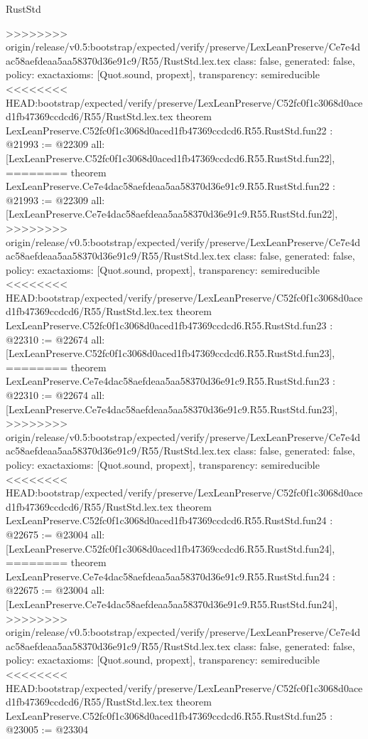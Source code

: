 \begin{lexlean}{RustStd}
\begin{coremodule}
{\begin{coremodule}
{{{{{{{{{{{{{{{{{{{{{{{{{>>>>>>>> origin/release/v0.5:bootstrap/expected/verify/preserve/LexLeanPreserve/Ce7e4dac58aefdeaa5aa58370d36e91c9/R55/RustStd.lex.tex
  class: false,
  generated: false,
  policy: exact{axioms: [Quot.sound, propext]},
  transparency: semireducible
}
<<<<<<<< HEAD:bootstrap/expected/verify/preserve/LexLeanPreserve/C52fc0f1c3068d0aced1fb47369ccdcd6/R55/RustStd.lex.tex
theorem LexLeanPreserve.C52fc0f1c3068d0aced1fb47369ccdcd6.R55.RustStd.fun22 : @21993 := @22309 {
  all: [LexLeanPreserve.C52fc0f1c3068d0aced1fb47369ccdcd6.R55.RustStd.fun22],
========
theorem LexLeanPreserve.Ce7e4dac58aefdeaa5aa58370d36e91c9.R55.RustStd.fun22 : @21993 := @22309 {
  all: [LexLeanPreserve.Ce7e4dac58aefdeaa5aa58370d36e91c9.R55.RustStd.fun22],
>>>>>>>> origin/release/v0.5:bootstrap/expected/verify/preserve/LexLeanPreserve/Ce7e4dac58aefdeaa5aa58370d36e91c9/R55/RustStd.lex.tex
  class: false,
  generated: false,
  policy: exact{axioms: [Quot.sound, propext]},
  transparency: semireducible
}
<<<<<<<< HEAD:bootstrap/expected/verify/preserve/LexLeanPreserve/C52fc0f1c3068d0aced1fb47369ccdcd6/R55/RustStd.lex.tex
theorem LexLeanPreserve.C52fc0f1c3068d0aced1fb47369ccdcd6.R55.RustStd.fun23 : @22310 := @22674 {
  all: [LexLeanPreserve.C52fc0f1c3068d0aced1fb47369ccdcd6.R55.RustStd.fun23],
========
theorem LexLeanPreserve.Ce7e4dac58aefdeaa5aa58370d36e91c9.R55.RustStd.fun23 : @22310 := @22674 {
  all: [LexLeanPreserve.Ce7e4dac58aefdeaa5aa58370d36e91c9.R55.RustStd.fun23],
>>>>>>>> origin/release/v0.5:bootstrap/expected/verify/preserve/LexLeanPreserve/Ce7e4dac58aefdeaa5aa58370d36e91c9/R55/RustStd.lex.tex
  class: false,
  generated: false,
  policy: exact{axioms: [Quot.sound, propext]},
  transparency: semireducible
}
<<<<<<<< HEAD:bootstrap/expected/verify/preserve/LexLeanPreserve/C52fc0f1c3068d0aced1fb47369ccdcd6/R55/RustStd.lex.tex
theorem LexLeanPreserve.C52fc0f1c3068d0aced1fb47369ccdcd6.R55.RustStd.fun24 : @22675 := @23004 {
  all: [LexLeanPreserve.C52fc0f1c3068d0aced1fb47369ccdcd6.R55.RustStd.fun24],
========
theorem LexLeanPreserve.Ce7e4dac58aefdeaa5aa58370d36e91c9.R55.RustStd.fun24 : @22675 := @23004 {
  all: [LexLeanPreserve.Ce7e4dac58aefdeaa5aa58370d36e91c9.R55.RustStd.fun24],
>>>>>>>> origin/release/v0.5:bootstrap/expected/verify/preserve/LexLeanPreserve/Ce7e4dac58aefdeaa5aa58370d36e91c9/R55/RustStd.lex.tex
  class: false,
  generated: false,
  policy: exact{axioms: [Quot.sound, propext]},
  transparency: semireducible
}
<<<<<<<< HEAD:bootstrap/expected/verify/preserve/LexLeanPreserve/C52fc0f1c3068d0aced1fb47369ccdcd6/R55/RustStd.lex.tex
theorem LexLeanPreserve.C52fc0f1c3068d0aced1fb47369ccdcd6.R55.RustStd.fun25 : @23005 := @23304 {
}}}}}}}}}}}}}}}}}}}}}}}}}}}}
\end{coremodule}}
\end{coremodule}
\end{lexlean}
